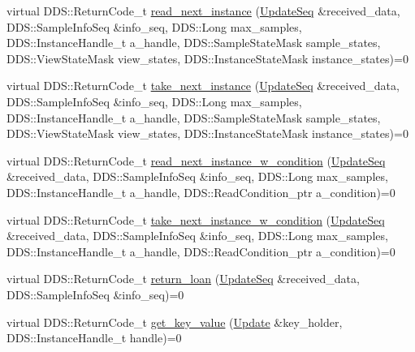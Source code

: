 \begin{DoxyCompactItemize}
\item 
virtual DDS::ReturnCode\_\-t \hyperlink{classKnowledge_1_1UpdateDataReader_a4cd59dd5dc9dc0aed118bac446ffaf8f}{read\_\-next\_\-instance} (\hyperlink{namespaceKnowledge_ab62e46316b954f0d249e0e45de7059dc}{UpdateSeq} \&received\_\-data, DDS::SampleInfoSeq \&info\_\-seq, DDS::Long max\_\-samples, DDS::InstanceHandle\_\-t a\_\-handle, DDS::SampleStateMask sample\_\-states, DDS::ViewStateMask view\_\-states, DDS::InstanceStateMask instance\_\-states)=0
\item 
virtual DDS::ReturnCode\_\-t \hyperlink{classKnowledge_1_1UpdateDataReader_aea925f946609743a2eea698d5de6720f}{take\_\-next\_\-instance} (\hyperlink{namespaceKnowledge_ab62e46316b954f0d249e0e45de7059dc}{UpdateSeq} \&received\_\-data, DDS::SampleInfoSeq \&info\_\-seq, DDS::Long max\_\-samples, DDS::InstanceHandle\_\-t a\_\-handle, DDS::SampleStateMask sample\_\-states, DDS::ViewStateMask view\_\-states, DDS::InstanceStateMask instance\_\-states)=0
\item 
virtual DDS::ReturnCode\_\-t \hyperlink{classKnowledge_1_1UpdateDataReader_adee304d2b374df5401b5c60fef44301b}{read\_\-next\_\-instance\_\-w\_\-condition} (\hyperlink{namespaceKnowledge_ab62e46316b954f0d249e0e45de7059dc}{UpdateSeq} \&received\_\-data, DDS::SampleInfoSeq \&info\_\-seq, DDS::Long max\_\-samples, DDS::InstanceHandle\_\-t a\_\-handle, DDS::ReadCondition\_\-ptr a\_\-condition)=0
\item 
virtual DDS::ReturnCode\_\-t \hyperlink{classKnowledge_1_1UpdateDataReader_a96fb568a9968f486076820455880e410}{take\_\-next\_\-instance\_\-w\_\-condition} (\hyperlink{namespaceKnowledge_ab62e46316b954f0d249e0e45de7059dc}{UpdateSeq} \&received\_\-data, DDS::SampleInfoSeq \&info\_\-seq, DDS::Long max\_\-samples, DDS::InstanceHandle\_\-t a\_\-handle, DDS::ReadCondition\_\-ptr a\_\-condition)=0
\item 
virtual DDS::ReturnCode\_\-t \hyperlink{classKnowledge_1_1UpdateDataReader_a8d6fa29703342018a59ccf1d70dee7c2}{return\_\-loan} (\hyperlink{namespaceKnowledge_ab62e46316b954f0d249e0e45de7059dc}{UpdateSeq} \&received\_\-data, DDS::SampleInfoSeq \&info\_\-seq)=0
\item 
virtual DDS::ReturnCode\_\-t \hyperlink{classKnowledge_1_1UpdateDataReader_adaf4a81ae777f656dadd82dd5dceca36}{get\_\-key\_\-value} (\hyperlink{structKnowledge_1_1Update}{Update} \&key\_\-holder, DDS::InstanceHandle\_\-t handle)=0
\end{DoxyCompactItemize}

